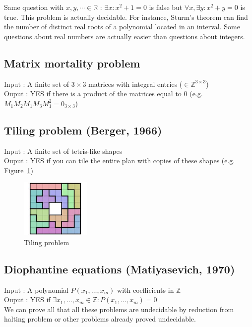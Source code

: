 Same question with $x,y,\cdots \in \mathbb{R}$ :  $\exists x : x^2+1=0$ is false but  $\forall x, \exists y : x^2+y=0$ is true. This problem is actually decidable. For instance, Sturm's theorem can find the number of distinct real roots of a polynomial located in an interval. Some questions about real numbers are actually easier than questions about integers.

\subsection{Matrix mortality problem}
Input : A finite set of $3\times3$ matrices with integral entries ($\in \mathbb{Z}^{3\times3}$)\\
Ouput : YES if there is a product of the matrices equal to $0$ (e.g. $M_1M_2M_1M_3M_1^2 = 0_{3\times3}$)

\subsection{Tiling problem (Berger, 1966)}
Input : A finite set of tetris-like shapes \\
Ouput : YES if you can tile the entire plan with copies of these shapes (e.g. Figure~\ref{Tiling})
\begin{figure}[!h]
                 \centering\includegraphics[width=0.3\textwidth]{pentomio.png}
         	\caption{Tiling problem}
        		\label{Tiling}
\end{figure}

\subsection{Diophantine equations (Matiyasevich, 1970)}
Input : A polynomial $P(x_1,\ldots, x_m)$ with coefficients in $\mathbb{Z}$ \\
Ouput : YES if $\exists x_1,\ldots, x_m \in \mathbb{Z} : P(x_1,\ldots, x_m) = 0$ \\


We can prove all that all these problems are undecidable by reduction from halting problem or other problems already proved undecidable.